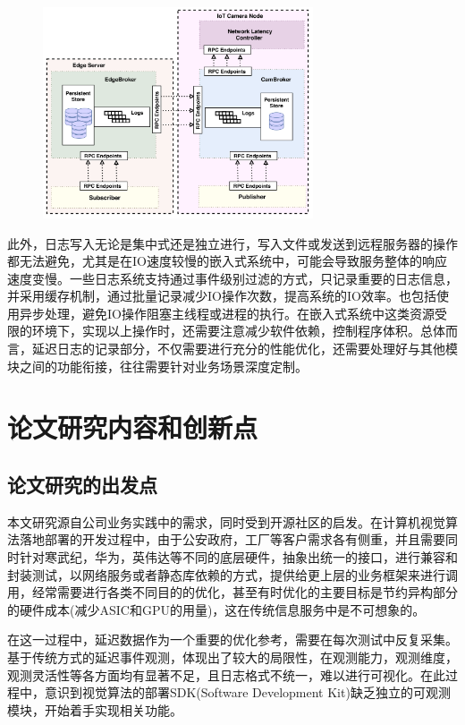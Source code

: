 \documentclass[master]{shtthesis}
\begin{document}
\begin{figure}[htbp]
	\centering
	\includegraphics[width=8cm]{img/rpc_log.png}
	\label{基于发布订阅的边缘计算日志系统}
\end{figure}

此外，日志写入无论是集中式还是独立进行，写入文件或发送到远程服务器的操作都无法避免，尤其是在IO速度较慢的嵌入式系统中，可能会导致服务整体的响应速度变慢。一些日志系统支持通过事件级别过滤的方式，只记录重要的日志信息，并采用缓存机制，通过批量记录减少IO操作次数，提高系统的IO效率。也包括使用异步处理，避免IO操作阻塞主线程或进程的执行。在嵌入式系统中这类资源受限的环境下，实现以上操作时，还需要注意减少软件依赖，控制程序体积。总体而言，延迟日志的记录部分，不仅需要进行充分的性能优化，还需要处理好与其他模块之间的功能衔接，往往需要针对业务场景深度定制。

\section{论文研究内容和创新点}\label{论文研究内容和创新点}
\subsection{论文研究的出发点}\label{论文研究的出发点}
本文研究源自公司业务实践中的需求，同时受到开源社区的启发。在计算机视觉算法落地部署的开发过程中，由于公安政府，工厂等客户需求各有侧重，并且需要同时针对寒武纪，华为，英伟达等不同的底层硬件，抽象出统一的接口，进行兼容和封装测试，以网络服务或者静态库依赖的方式，提供给更上层的业务框架来进行调用，经常需要进行各类不同目的的优化，甚至有时优化的主要目标是节约异构部分的硬件成本(减少ASIC和GPU的用量)，这在传统信息服务中是不可想象的。

在这一过程中，延迟数据作为一个重要的优化参考，需要在每次测试中反复采集。基于传统方式的延迟事件观测，体现出了较大的局限性，在观测能力，观测维度，观测灵活性等各方面均有显著不足，且日志格式不统一，难以进行可视化。在此过程中，意识到视觉算法的部署SDK(Software Development Kit)缺乏独立的可观测模块，开始着手实现相关功能。
\end{document}
